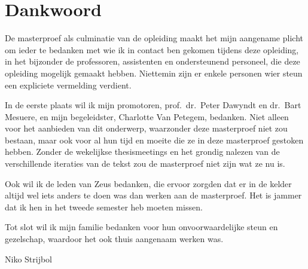 \chapter*{Dankwoord}\label{ch:dankwoord}

De masterproef als culminatie van de opleiding maakt het mijn aangename plicht om ieder te bedanken met wie ik in contact ben gekomen tijdens deze opleiding, in het bijzonder de professoren, assistenten en ondersteunend personeel, die deze opleiding mogelijk gemaakt hebben.
Niettemin zijn er enkele personen wier steun een expliciete vermelding verdient.

In de eerste plaats wil ik mijn promotoren, prof.\ dr.\ Peter Dawyndt en dr.\ Bart Mesuere, en mijn begeleidster, Charlotte Van Petegem, bedanken.
Niet alleen voor het aanbieden van dit onderwerp, waarzonder deze masterproef niet zou bestaan, maar ook voor al hun tijd en moeite die ze in deze masterproef gestoken hebben.
Zonder de wekelijkse thesismeetings en het grondig nalezen van de verschillende iteraties van de tekst zou de masterproef niet zijn wat ze nu is.

Ook wil ik de leden van Zeus  bedanken, die ervoor zorgden dat er in de kelder altijd wel iets anders te doen was dan werken aan de masterproef.
Het is jammer dat ik hen in het tweede semester heb moeten missen.

Tot slot wil ik mijn familie bedanken voor hun onvoorwaardelijke steun en gezelschap, waardoor het ook thuis aangenaam werken was.

\begin{flushright}
    Niko Strijbol
\end{flushright}
